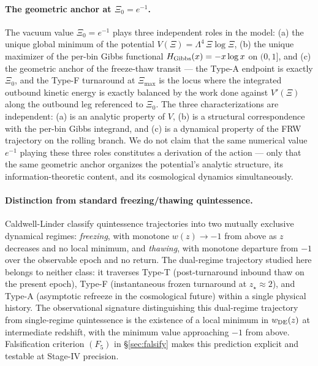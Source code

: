 \documentclass[11pt,reqno]{amsart}
\theoremstyle{plain}
\theoremstyle{definition}
\theoremstyle{remark}
\begin{document}
\paragraph{The geometric anchor at $\Xi_0 = e^{-1}$.}
The vacuum value $\Xi_0 = e^{-1}$ plays three independent roles in the
model: (a) the unique global minimum of the potential
$V(\Xi) = \Lambda^4\,\Xi\log\Xi$, (b) the unique maximizer of the
per-bin Gibbs functional $H_{\rm Gibbs}(x) = -x\log x$ on $(0, 1]$, and
(c) the geometric anchor of the freeze-thaw transit --- the Type-A
endpoint is exactly $\Xi_0$, and the Type-F turnaround at $\Xi_{\max}$
is the locus where the integrated outbound kinetic energy is exactly
balanced by the work done against $V'(\Xi)$ along the outbound leg
referenced to $\Xi_0$. The three characterizations are independent:
(a) is an analytic property of $V$, (b) is a structural correspondence
with the per-bin Gibbs integrand, and (c) is a dynamical property of
the FRW trajectory on the rolling branch. We do not claim that the
same numerical value $e^{-1}$ playing these three roles constitutes a
derivation of the action --- only that the same geometric anchor
organizes the potential's analytic structure, its information-theoretic
content, and its cosmological dynamics simultaneously.

\paragraph{Distinction from standard freezing/thawing quintessence.}
Caldwell-Linder \cite{CaldwellLinder2005} classify quintessence
trajectories into two mutually exclusive dynamical regimes:
\emph{freezing}, with monotone $w(z) \to -1$ from above as $z$
decreases and no local minimum, and \emph{thawing}, with monotone
departure from $-1$ over the observable epoch and no return. The
dual-regime trajectory studied here belongs to neither class: it
traverses Type-T (post-turnaround inbound thaw on the present epoch),
Type-F (instantaneous frozen turnaround at $z_\star \approx 2$), and
Type-A (asymptotic refreeze in the cosmological future) within a
single physical history. The observational signature distinguishing
this dual-regime trajectory from single-regime quintessence is the
existence of a local minimum in $w_{\rm DE}(z)$ at intermediate
redshift, with the minimum value approaching $-1$ from above.
Falsification criterion $(F_5)$ in \S\ref{sec:falsify} makes this
prediction explicit and testable at Stage-IV precision.
\end{document}
